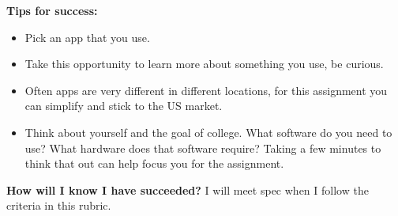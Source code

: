 \documentclass[
  letterpaper,
  DIV=11,
  numbers=noendperiod]{scrreprt}
\begin{document}
\textbf{Tips for success:}

\begin{itemize}
\item
  Pick an app that you use.
\item
  Take this opportunity to learn more about something you use, be
  curious.
\item
  Often apps are very different in different locations, for this
  assignment you can simplify and stick to the US market.
\item
  Think about yourself and the goal of college. What software do you
  need to use? What hardware does that software require? Taking a few
  minutes to think that out can help focus you for the assignment.
\end{itemize}

\textbf{How will I know I have succeeded?} I will meet spec when I
follow the criteria in this rubric.
\end{document}
